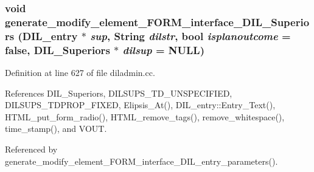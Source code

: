 \subsubsection{\setlength{\rightskip}{0pt plus 5cm}void generate\_\-modify\_\-element\_\-FORM\_\-interface\_\-DIL\_\-Superiors ({\bf DIL\_\-entry} $\ast$ {\em sup}, {\bf String} {\em dilstr}, bool {\em isplanoutcome} = {\bf false}, DIL\_\-Superiors $\ast$ {\em dilsup} = NULL)}\label{diladmin_8cc_a8}




Definition at line 627 of file diladmin.cc.

References DIL\_\-Superiors, DILSUPS\_\-TD\_\-UNSPECIFIED, DILSUPS\_\-TDPROP\_\-FIXED, Elipsis\_\-At(), DIL\_\-entry::Entry\_\-Text(), HTML\_\-put\_\-form\_\-radio(), HTML\_\-remove\_\-tags(), remove\_\-whitespace(), time\_\-stamp(), and VOUT.

Referenced by generate\_\-modify\_\-element\_\-FORM\_\-interface\_\-DIL\_\-entry\_\-parameters().



